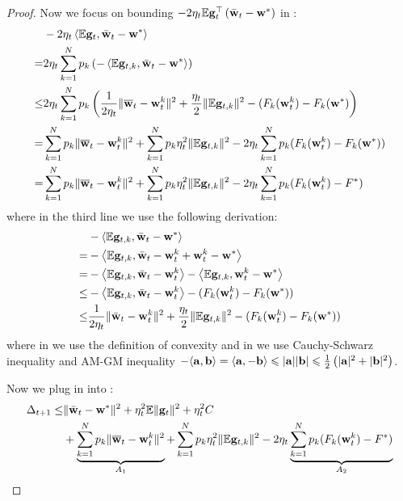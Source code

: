 \begin{proof}
Now we focus on bounding $-2 \eta_{t} \mathbb{E} {\mathbf{g}}_{t}^{\top}\left(\bar{{\mathbf{w}}}_{t}-{\mathbf{w}}^{*}\right)$ in \eq{\ref{eq:expand}}: 
\begin{align}
	& -2 \eta_{t} \left<\mathbb{E} {\mathbf{g}}_{t}, \bar{{\mathbf{w}}}_{t}-{\mathbf{w}}^{*} \right>\\
  = & 2 \eta_{t} \sum_{k=1}^N p_k \left(-\left<\mathbb{E} {\mathbf{g}}_{t,k}, \bar{{\mathbf{w}}}_{t}-{\mathbf{w}}^{*} \right> \right) \\
  \leq& 2 \eta_{t} \sum_{k=1}^N p_k  \left(\frac{1}{2\eta_t} \|\overline{{\mathbf{w}}}_t - {\mathbf{w}}_t^k\|^2 + \frac{\eta_t}{2} \|\mathbb{E} {\mathbf{g}}_{t,k}\|^2 - (F_k({\mathbf{w}}_t^k) - F_k({\mathbf{w}}^*) \right) \\
  =& \sum_{k=1}^N p_k \|\overline{{\mathbf{w}}}_t - {\mathbf{w}}_t^k\|^2 +  \sum_{k=1}^N p_k \eta_t^2 \|\mathbb{E} {\mathbf{g}}_{t,k}\|^2 
  - 2\eta_t\sum_{k=1}^N p_k (F_k({\mathbf{w}}_t^k) - F_k({\mathbf{w}}^*)) \\
  =& \sum_{k=1}^N p_k \|\overline{{\mathbf{w}}}_t - {\mathbf{w}}_t^k\|^2 +  \sum_{k=1}^N p_k \eta_t^2 \|\mathbb{E} {\mathbf{g}}_{t,k}\|^2 
  - 2\eta_t\sum_{k=1}^N p_k (F_k({\mathbf{w}}_t^k) - F^*) \label{eq:exp4}
\end{align}
where in the third line we use the following derivation:
\begin{align}
	& -\left<\mathbb{E} {\mathbf{g}}_{t,k}, \bar{{\mathbf{w}}}_{t} - {\mathbf{w}}^{*} \right>\\
=& - \left<\mathbb{E} {\mathbf{g}}_{t,k}, \bar{{\mathbf{w}}}_{t} - {\mathbf{w}}_t^k +  {\mathbf{w}}_t^k - {\mathbf{w}}^{*} \right>\\
=& - \left<\mathbb{E} {\mathbf{g}}_{t,k}, \bar{{\mathbf{w}}}_{t} - {\mathbf{w}}_t^k\right> - \left<\mathbb{E} {\mathbf{g}}_{t,k}, {\mathbf{w}}_t^k - {\mathbf{w}}^{*} \right>\\
\leq & - \left<\mathbb{E} {\mathbf{g}}_{t,k}, \bar{{\mathbf{w}}}_{t} - {\mathbf{w}}_t^k\right> - (F_k({\mathbf{w}}_t^k) - F_k({\mathbf{w}}^*)) \label{eq:3}\\
\leq & \frac{1}{2\eta_t} \|\bar{{\mathbf{w}}}_t - {\mathbf{w}}_t^k\|^2 + \frac{\eta_t}{2} \|\mathbb{E} {\mathbf{g}}_{t,k}\|^2
- (F_k({\mathbf{w}}_t^k) - F_k({\mathbf{w}}^*)) \label{eq:4}
\end{align}
where in \eq{\ref{eq:3}} we use the definition of convexity and in \eq{\ref{eq:4}} we use Cauchy-Schwarz inequality and AM-GM inequality $-\langle{\mathbf{a}}, {\mathbf{b}}\rangle=\langle{\mathbf{a}},-{\mathbf{b}}\rangle \leqslant|{\mathbf{a}}||{\mathbf{b}}| \leqslant \frac{1}{2}\left(|{\mathbf{a}}|^{2}+|{\mathbf{b}}|^{2}\right)$.


Now we plug in \eq{\ref{eq:exp4}} into \eq{\ref{eq:expand}}:
\begin{align}
	\Delta_{t+1} \leq& \|\bar{{\mathbf{w}}}_{t}-{\mathbf{w}}^{*}\|^{2} + \eta_{t}^{2} \mathbb{E}\| {\mathbf{g}}_{t} \|^{2}  + \eta_t^2 C \\
	& + \underbrace{\sum_{k=1}^N p_k \|\overline{{\mathbf{w}}}_t - {\mathbf{w}}_t^k\|^2}_{A_1} +  \sum_{k=1}^N p_k \eta_t^2 \|\mathbb{E} {\mathbf{g}}_{t,k}\|^2
  - 2\eta_t\underbrace{\sum_{k=1}^N p_k (F_k({\mathbf{w}}_t^k) - F^*)}_{A_2} \label{eq:cvxmain2}
\end{align}


\end{proof}
